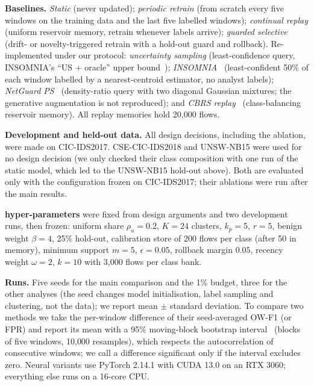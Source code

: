 \textbf{Baselines.} \emph{Static} (never updated); \emph{periodic retrain} (from scratch every five windows on
the training data and the last five labelled windows); \emph{continual replay} (uniform reservoir memory, retrain
whenever labels arrive); \emph{guarded selective} (drift- or novelty-triggered retrain with a hold-out guard and
rollback). Re-implemented under our protocol: \emph{uncertainty sampling} (least-confidence query, INSOMNIA's
``US + oracle'' upper bound~\cite{andresini2021insomnia}); \emph{INSOMNIA}~\cite{andresini2021insomnia}
(least-confident 50\% of each window labelled by a nearest-centroid estimator, no analyst labels);
\emph{NetGuard PS}~\cite{gupta2025netguard} (density-ratio query with two diagonal Gaussian mixtures; the
generative augmentation is not reproduced); and \emph{CBRS replay}~\cite{chrysakis2020online,amalapuram2023augmented}
(class-balancing reservoir memory). All replay memories hold 20{,}000 flows.

\textbf{Development and held-out data.} All design decisions, including the ablation, were made on
CIC-IDS2017. CSE-CIC-IDS2018 and UNSW-NB15 were used for no design decision (we only checked their class
composition with one run of the static model, which led to the UNSW-NB15 hold-out above). Both are
evaluated only with the configuration frozen on CIC-IDS2017; their ablations were run after the main results.

\textbf{\nova{} hyper-parameters} were fixed from design arguments and two development runs, then frozen:
uniform share $\rho_u = 0.2$, $K = 24$ clusters, $k_p = 5$, $r = 5$, benign weight $\beta = 4$, 25\% hold-out,
calibration store of 200 flows per class (after 50 in memory), minimum support $m = 5$, $\epsilon = 0.05$,
rollback margin $0.05$, recency weight $\omega = 2$, $k = 10$ with 3{,}000 flows per class bank.

\textbf{Runs.} Five seeds for the main comparison and the 1\% budget, three for the other analyses (the seed
changes model initialisation, label sampling and clustering, not the data); we report mean $\pm$ standard
deviation. To compare two methods we take the
per-window difference of their seed-averaged OW-F1 (or FPR) and report its mean with a 95\% moving-block bootstrap
interval~\cite{kunsch1989jackknife} (blocks of five windows, 10{,}000 resamples), which respects the autocorrelation of consecutive windows;
we call a difference significant only if the interval excludes zero. Neural variants use PyTorch 2.14.1 with CUDA
13.0 on an RTX 3060; everything else runs on a 16-core CPU.

